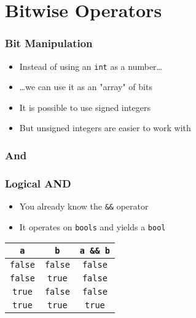 \section{Bitwise Operators}
\frame{\tableofcontents[currentsection]}

\begin{frame}
  \frametitle{Bit Manipulation}
  \begin{itemize}
    \item Instead of using an \texttt{int} as a number\dots
    \item \dots we can use it as an "array" of bits
    \item It is possible to use signed integers
    \item But unsigned integers are easier to work with
  \end{itemize}
\end{frame}

\subsubsection{And}
\frame{\tableofcontents[currentsubsection]}

\begin{frame}
  \frametitle{Logical AND}
  \begin{itemize}
    \item You already know the \texttt{\&\&} operator
    \item It operates on \texttt{bools} and yields a \texttt{bool}
  \end{itemize}
  \begin{center}
    \begin{tabular}{ccc}
      \toprule
      \texttt{a} & \texttt{b} & \texttt{a \&\& b} \\
      \midrule
      \texttt{false} & \texttt{false} & \texttt{false} \\
      \texttt{false} & \texttt{true} & \texttt{false} \\
      \texttt{true} & \texttt{false} & \texttt{false} \\
      \texttt{true} & \texttt{true} & \texttt{true} \\
      \bottomrule
    \end{tabular}
  \end{center}
\end{frame}

